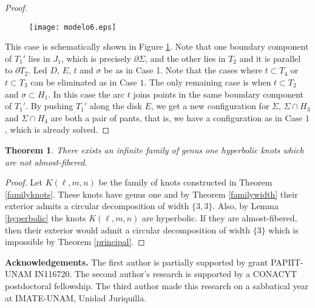 \documentclass[12pt]{amsart}
\newtheorem{teo}{Theorem}
\begin{document}
\begin{proof}
\begin{figure}
\begin{center}
\texttt{[image: modelo6.eps]}
\end{center}
\caption{}
\label{case6}
\end{figure}
This case is schematically shown in Figure \ref{case6}. Note that one boundary component of $T_1'$ lies in $J_1$, which is precisely $\partial \Sigma$, and the other lies in $T_2$ and it is parallel to $\partial T_2$. Led $D$, $E$, $t$ and $\sigma$ be as in Case 1.
Note that the cases where $t\subset T_4$ or $t\subset T_3$ can be eliminated as in Case $1$. The only remaining case is when $t \subset T_2$ and $\sigma \subset H_1$. In this case the arc $t$ joins points in the same boundary component of $T_1'$. By pushing $T_1'$ along the disk $E$, we get a new configuration for $\Sigma$, $\Sigma \cap H_3$ and $\Sigma \cap H_4$ are both a pair of pants, that is, we have  a configuration as in Case $1$, which is already solved. 

\end{proof}




\begin{teo}\label{main}
There exists an infinite family of genus one hyperbolic knots which are not almost-fibered. 
\end{teo}

\begin{proof}
Let $K(\ell,m,n)$ be the family of knots constructed in Theorem \ref{familyknots}. These knots have genus one and by Theorem \ref{familywidth} their exterior admits a circular decomposition of width $\{3,3\}$. Also, by Lemma \ref{hyperbolic} the knots $K(\ell,m,n)$ are hyperbolic. If they are almost-fibered, then their exterior would admit a circular decomposition of width $\{3\}$ which is impossible by Theorem \ref{principal}.
\end{proof}



\vskip20pt
\textbf{Acknowledgements.}
The first author is partially supported by grant PAPIIT-UNAM IN116720.
The second author's research is supported by a CONACYT postdoctoral fellowship. 
The third author made this research on a sabbatical year at IMATE-UNAM, Unidad Juriquilla.
\end{document}
